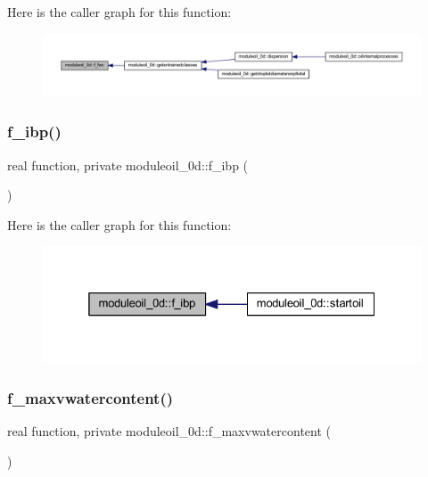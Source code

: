 Here is the caller graph for this function\+:\nopagebreak
\begin{figure}[H]
\begin{center}
\leavevmode
\includegraphics[width=350pt]{namespacemoduleoil__0d_a61a73c3b473d2b0773d7812c5c93cea0_icgraph}
\end{center}
\end{figure}
\mbox{\label{namespacemoduleoil__0d_ab82b97aa427e0d7e1bbc78682343551e}} 
\subsubsection{\texorpdfstring{f\+\_\+ibp()}{f\_ibp()}}
{\footnotesize\ttfamily real function, private moduleoil\+\_\+0d\+::f\+\_\+ibp (\begin{DoxyParamCaption}{ }\end{DoxyParamCaption})\hspace{0.3cm}{\ttfamily [private]}}

Here is the caller graph for this function\+:\nopagebreak
\begin{figure}[H]
\begin{center}
\leavevmode
\includegraphics[width=325pt]{namespacemoduleoil__0d_ab82b97aa427e0d7e1bbc78682343551e_icgraph}
\end{center}
\end{figure}
\mbox{\label{namespacemoduleoil__0d_acf1e57739fa15b9c76feeec263af3ff1}} 
\subsubsection{\texorpdfstring{f\+\_\+maxvwatercontent()}{f\_maxvwatercontent()}}
{\footnotesize\ttfamily real function, private moduleoil\+\_\+0d\+::f\+\_\+maxvwatercontent (\begin{DoxyParamCaption}{ }\end{DoxyParamCaption})\hspace{0.3cm}{\ttfamily [private]}}


